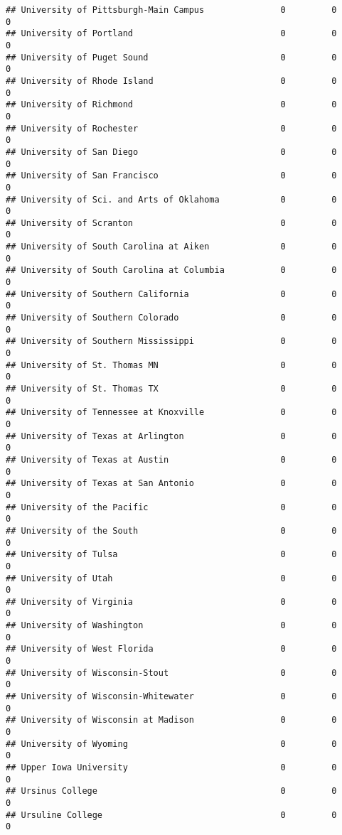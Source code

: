 \documentclass[
]{article}
\begin{document}
\begin{verbatim}
## University of Pittsburgh-Main Campus               0         0         0
## University of Portland                             0         0         0
## University of Puget Sound                          0         0         0
## University of Rhode Island                         0         0         0
## University of Richmond                             0         0         0
## University of Rochester                            0         0         0
## University of San Diego                            0         0         0
## University of San Francisco                        0         0         0
## University of Sci. and Arts of Oklahoma            0         0         0
## University of Scranton                             0         0         0
## University of South Carolina at Aiken              0         0         0
## University of South Carolina at Columbia           0         0         0
## University of Southern California                  0         0         0
## University of Southern Colorado                    0         0         0
## University of Southern Mississippi                 0         0         0
## University of St. Thomas MN                        0         0         0
## University of St. Thomas TX                        0         0         0
## University of Tennessee at Knoxville               0         0         0
## University of Texas at Arlington                   0         0         0
## University of Texas at Austin                      0         0         0
## University of Texas at San Antonio                 0         0         0
## University of the Pacific                          0         0         0
## University of the South                            0         0         0
## University of Tulsa                                0         0         0
## University of Utah                                 0         0         0
## University of Virginia                             0         0         0
## University of Washington                           0         0         0
## University of West Florida                         0         0         0
## University of Wisconsin-Stout                      0         0         0
## University of Wisconsin-Whitewater                 0         0         0
## University of Wisconsin at Madison                 0         0         0
## University of Wyoming                              0         0         0
## Upper Iowa University                              0         0         0
## Ursinus College                                    0         0         0
## Ursuline College                                   0         0         0

\end{verbatim}
\end{document}
